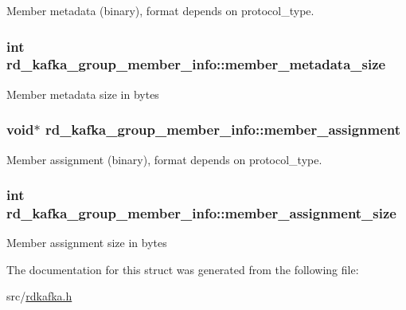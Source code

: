 \label{structrd__kafka__group__member__info_ac908871fe2c69611a4173773ab8abf2a}
Member metadata (binary), format depends on {\ttfamily protocol\_\-type}. \hypertarget{structrd__kafka__group__member__info_a50b02ae32b364f42d8a5a1423fb08a14}{
\subsubsection[{member\_\-metadata\_\-size}]{\setlength{\rightskip}{0pt plus 5cm}int {\bf rd\_\-kafka\_\-group\_\-member\_\-info::member\_\-metadata\_\-size}}}
\label{structrd__kafka__group__member__info_a50b02ae32b364f42d8a5a1423fb08a14}
Member metadata size in bytes \hypertarget{structrd__kafka__group__member__info_ae8edf41f4c2781c106e5a8a703dae102}{
\subsubsection[{member\_\-assignment}]{\setlength{\rightskip}{0pt plus 5cm}void$\ast$ {\bf rd\_\-kafka\_\-group\_\-member\_\-info::member\_\-assignment}}}
\label{structrd__kafka__group__member__info_ae8edf41f4c2781c106e5a8a703dae102}
Member assignment (binary), format depends on {\ttfamily protocol\_\-type}. \hypertarget{structrd__kafka__group__member__info_a4fbe1d1084f1fe8113a575020e228412}{
\subsubsection[{member\_\-assignment\_\-size}]{\setlength{\rightskip}{0pt plus 5cm}int {\bf rd\_\-kafka\_\-group\_\-member\_\-info::member\_\-assignment\_\-size}}}
\label{structrd__kafka__group__member__info_a4fbe1d1084f1fe8113a575020e228412}
Member assignment size in bytes 

The documentation for this struct was generated from the following file:\begin{DoxyCompactItemize}
\item 
src/\hyperlink{rdkafka_8h}{rdkafka.h}\end{DoxyCompactItemize}
